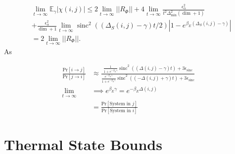 \documentclass{article}
\newcommand{\abs}[1]{\left| #1 \right|}
\newcommand{\norm}[1]{\left| \left| #1 \right| \right|}
\newcommand{\prob}[1]{\text{Pr}\left[ #1 \right]}
\DeclareMathOperator{\sinc}{sinc}
\begin{document}
\begin{align}
    &\lim_{t \to \infty} \mathbb{E}_{\gamma} \abs{\chi(i,j)} \leq 2 \lim_{t \to \infty} \norm{R_{\Phi}} + 4 \lim_{t \to \infty} \frac{\epsilon_{\alpha}^2}{t^2 \Delta_{\min}^2 (\dim + 1)} \nonumber \\
    &+ \frac{\epsilon_{\alpha}^2}{\dim + 1} \lim_{t \to \infty} \sinc^2((\Delta_S(i,j) - \gamma)t/2) \abs{1 - e^{\beta_E(\Delta_S(i,j) - \gamma)}} \\
    &= 2 \lim_{t \to \infty} \norm{R_{\Phi}}.
\end{align}
As 

\begin{align}
    \frac{\prob{i \to j}}{\prob{j \to i}} &\approx \frac{\frac{1}{1 + e^{-\beta_E \gamma}}\sinc^2 ((\Delta(i,j) - \gamma)t)+ 3 \epsilon_{\sinc}}{\frac{e^{-\beta_E \gamma}}{1 + e^{-\beta_E \gamma}} \sinc^2((-\Delta(i,j) + \gamma)t) + 3 \epsilon_{\sinc}}  \nonumber \\
    \lim_{t \to \infty} &\implies e^{\beta_E \gamma} = e^{-\beta_E \Delta(i,j)} \nonumber \\
    &= \frac{\prob{\text{System in } j}}{ \prob{\text{System in } i}} \nonumber
\end{align}




\section{Thermal State Bounds}
\end{document}
